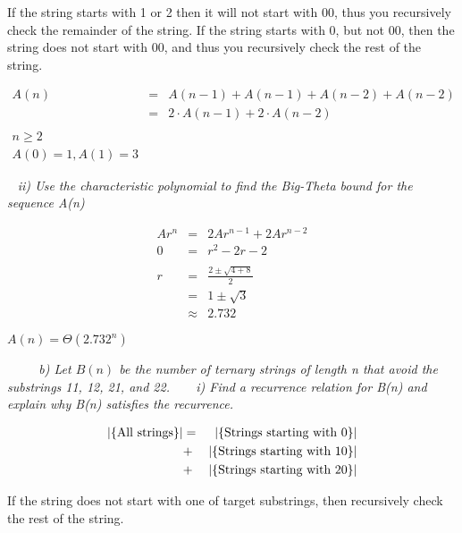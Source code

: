 \documentclass[12pt, letterpaper]{article}
\begin{document}
\textnormal{If the string starts with 1 or 2 then it will not start with 00, thus you recursively check the remainder of the string. If the string starts with 0, but not 00, then the string does not start with 00, and thus you recursively check the rest of the string. }

\begin{eqnarray*}
    A(n) &=& A(n - 1) + A(n - 1) + A(n - 2) + A(n - 2) \\
    &=& 2 \cdot A(n - 1) + 2 \cdot  A(n-2) \\
    \\
    n \ge 2 \\
    A(0) = 1, A(1) = 3
\end{eqnarray*}



\-\ \newline
\it{ ii) Use the characteristic polynomial to find the Big-Theta bound for the sequence A(n) }

\begin{eqnarray*}
    Ar^n &=& 2Ar^{n-1} + 2Ar^{n-2} \\
    0 &=& r^2 - 2r - 2 \\
    \\
    r &=& \frac{ 2 \pm \sqrt{4 + 8} }{2} \\
    &=& 1 \pm \sqrt{3} \\
    &\approx& 2.732
\end{eqnarray*}

\textnormal{\( A(n) = \Theta(2.732^n) \)}

\-\ \newline
\-\ \newline
\-\ \it{ b) Let \(B(n)\) be the number of ternary strings of length n that avoid the substrings 11, 12, 21, and 22. }
\-\ \newline
\-\ \it{ i) Find a recurrence relation for B(n) and explain why B(n) satisfies the recurrence. }
\-\ \newline

\begin{eqnarray*}
    |\{\textnormal{All strings}\}| &=& |\{ \textnormal{Strings starting with 0} \}| \\
    &+& |\{ \textnormal{Strings starting with 10} \}| \\
    &+& |\{ \textnormal{Strings starting with 20} \}| \\
    \end{eqnarray*}

\textnormal{ If the string does not start with one of target substrings, then recursively check the rest of the string. }
\end{document}
